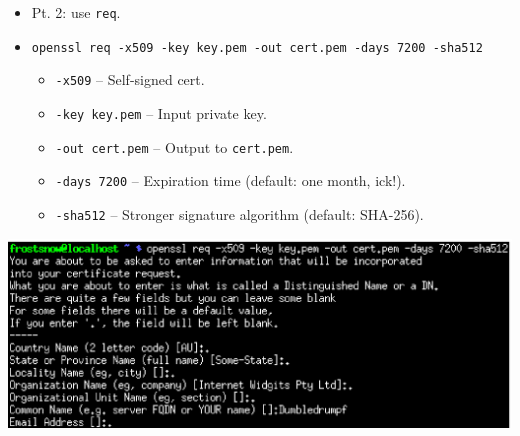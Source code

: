 \documentclass[xcolor={dvipsnames,svgnames},hyperref=dvips]{beamer}
\begin{document}
	\begin{frame}
		\begin{itemize}
		\item Pt. 2: use \texttt{req}.
		\item \texttt{openssl req -x509 -key key.pem -out cert.pem -days 7200 -sha512}
		\begin{itemize}
			\item \texttt{-x509} -- Self-signed cert.
			\item \texttt{-key key.pem} -- Input private key.
			\item \texttt{-out cert.pem} -- Output to \texttt{cert.pem}.
			\item \texttt{-days 7200} -- Expiration time (default: one month, ick!).
			\item \texttt{-sha512} -- Stronger signature algorithm (default: SHA-256).
		\end{itemize}
		\end{itemize}
	\end{frame}
	\begin{frame}
		\center\includegraphics[scale=0.55]{selfsigncert.ps}
	\end{frame}
\end{document}
